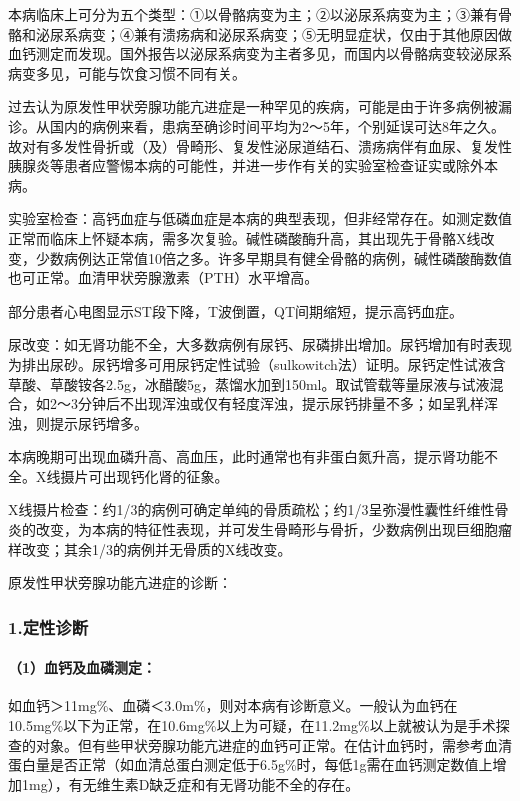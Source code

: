 本病临床上可分为五个类型：①以骨骼病变为主；②以泌尿系病变为主；③兼有骨骼和泌尿系病变；④兼有溃疡病和泌尿系病变；⑤无明显症状，仅由于其他原因做血钙测定而发现。国外报告以泌尿系病变为主者多见，而国内以骨骼病变较泌尿系病变多见，可能与饮食习惯不同有关。

过去认为原发性甲状旁腺功能亢进症是一种罕见的疾病，可能是由于许多病例被漏诊。从国内的病例来看，患病至确诊时间平均为2～5年，个别延误可达8年之久。故对有多发性骨折或（及）骨畸形、复发性泌尿道结石、溃疡病伴有血尿、复发性胰腺炎等患者应警惕本病的可能性，并进一步作有关的实验室检查证实或除外本病。

实验室检查：高钙血症与低磷血症是本病的典型表现，但非经常存在。如测定数值正常而临床上怀疑本病，需多次复验。碱性磷酸酶升高，其出现先于骨骼X线改变，少数病例达正常值10倍之多。许多早期具有健全骨骼的病例，碱性磷酸酶数值也可正常。血清甲状旁腺激素（PTH）水平增高。

部分患者心电图显示ST段下降，T波倒置，QT间期缩短，提示高钙血症。

尿改变：如无肾功能不全，大多数病例有尿钙、尿磷排出增加。尿钙增加有时表现为排出尿砂。尿钙增多可用尿钙定性试验（sulkowitch法）证明。尿钙定性试液含草酸、草酸铵各2.5g，冰醋酸5g，蒸馏水加到150ml。取试管载等量尿液与试液混合，如2～3分钟后不出现浑浊或仅有轻度浑浊，提示尿钙排量不多；如呈乳样浑浊，则提示尿钙增多。

本病晚期可出现血磷升高、高血压，此时通常也有非蛋白氮升高，提示肾功能不全。X线摄片可出现钙化肾的征象。

X线摄片检查：约1/3的病例可确定单纯的骨质疏松；约1/3呈弥漫性囊性纤维性骨炎的改变，为本病的特征性表现，并可发生骨畸形与骨折，少数病例出现巨细胞瘤样改变；其余1/3的病例并无骨质的X线改变。

原发性甲状旁腺功能亢进症的诊断：

\subsubsection{1.定性诊断}

\paragraph{（1）血钙及血磷测定：}

如血钙＞11mg\%、血磷＜3.0m\%，则对本病有诊断意义。一般认为血钙在10.5mg\%以下为正常，在10.6mg\%以上为可疑，在11.2mg\%以上就被认为是手术探查的对象。但有些甲状旁腺功能亢进症的血钙可正常。在估计血钙时，需参考血清蛋白量是否正常（如血清总蛋白测定低于6.5g\%时，每低1g需在血钙测定数值上增加1mg），有无维生素D缺乏症和有无肾功能不全的存在。

